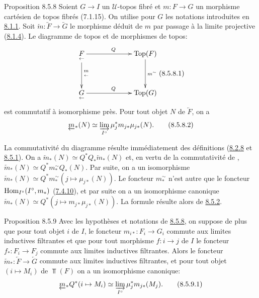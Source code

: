 \documentclass[10pt]{../fichiers-configuration-latex/smfart}
\begin{document}
\begin{enonce*}{Proposition 8.5.8}
Soient $G \to I$ un $𝒰$-topos fibré et $m : F \to G$  un morphisme
cartésien de topos fibrés (7.1.15). On
utilise pour $G$ les notations
introduites en \hyperref[VI.def8.1.1]{8.1.1}. Soit $\underleftarrow{m} : \underleftarrow{F} \to
\underleftarrow{G}$ le morphisme déduit de $m$ par passage à la limite
projective (\hyperref[VI.subsubsec8.1.4]{8.1.4}). Le diagramme de topos et de morphismes de topos:
\[\vcenter{
\xymatrix@C=2.25cm@R=1.25cm{
\underset{\leftarrow}{F}  \ar[r]^{Q} \ar[d]^{\underset{\leftarrow}{m}}& \Top(F)\ar[d]^{m^{\sim}}\\
\underset{\leftarrow}{G}  \ar[r]^{Q} & \Top(G)
}}\leqno{(8.5.8.1)}
\]
est commutatif à isomorphisme près. Pour tout objet $N$ de
$\underleftarrow{F}$, on a
\begin{equation*}
\underleftarrow{m}_{\ast} (N) \simeq \varinjlim_{I^{\circ}} \mu_j^{\ast}
m_{j\ast} \mu_{j\ast} (N){}.\tag{8.5.8.2}
\end{equation*}
\end{enonce*}

La commutativité du diagramme  résulte
immédiatement des définitions (\hyperref[VI.subsubsec8.2.8]{8.2.8} et
\hyperref[VI.subsubsec8.5.1]{8.5.1}). On a $\underleftarrow{m}_{\ast} (N) \simeq
Q^{\ast} Q_{\ast} \underleftarrow{m}_{\ast} (N)$ et, en vertu de la
commutativité de , $\underleftarrow{m}_{\ast} (N)
\simeq Q^{\ast}m^{\sim}_{\ast} Q_{\ast} (N)$. Par suite, on a un
isomorphisme $\underleftarrow{m}_{\ast} (N) \simeq Q^{\ast}
m^{\sim}_{\ast} (j \mapsto \mu_{j\ast} (N))$. Le foncteur
$m_{\ast}^{\sim}$ n'est autre que le foncteur $\operatorname{Hom}_{I^{\circ}}
(I^{\circ}, m_{\ast})$ (\hyperref[VI.prop7.4.10]{7.4.10}), et par suite on a un
isomorphisme canonique $\underleftarrow{m}_{\ast} (N) \simeq
Q^{\ast} (j \mapsto m_{j\ast} \mu_{j\ast} (N))$. La formule
 résulte alors de \hyperref[VI.prop8.5.2]{8.5.2}.

\begin{enonce*}{Proposition 8.5.9}
Avec les hypothèses et notations de \hyperref[VI.prop8.5.8]{8.5.8}, on suppose de plus que pour
tout objet $i$ de $I$, le foncteur $m_{i\ast} : F_{i} \to G_i$ commute aux
limites inductives filtrantes et que pour tout morphisme $f : i \to j$
de $I$ le foncteur $f_{\ast} : F_i \to F_j$ commute aux limites
inductives filtrantes. Alors le foncteur $\underleftarrow{m}_{\ast} :
\underleftarrow{F} \to \underleftarrow{G}$ commute aux limites inductives
filtrantes, et pour tout objet $(i \mapsto M_i)$ de $\Top(F)$ on a un
isomorphisme canonique:
\begin{equation*}
\underleftarrow{m}_{\ast} Q^{\ast} (i \mapsto M_i) \simeq
\varinjlim_{I^{\circ}} \mu^{\ast}_j m_{j\ast} (M_j){}.\tag{8.5.9.1}
\end{equation*}
\end{enonce*}
\end{document}
